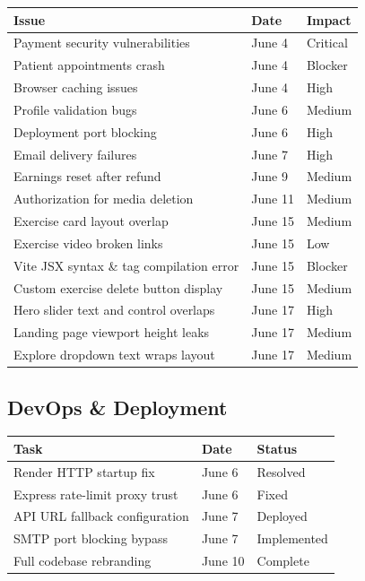 \documentclass[11pt,a4paper]{article}
\begin{document}
\begin{itemize}
{\begin{table}[h!]
\centering
\begin{tabularx}{\textwidth}{X l l}
\toprule
\textbf{Issue} & \textbf{Date} & \textbf{Impact} \\
\midrule
Payment security vulnerabilities    & June 4  & Critical \\
Patient appointments crash          & June 4  & Blocker  \\
Browser caching issues              & June 4  & High     \\
Profile validation bugs             & June 6  & Medium   \\
Deployment port blocking            & June 6  & High     \\
Email delivery failures             & June 7  & High     \\
Earnings reset after refund         & June 9  & Medium   \\
Authorization for media deletion    & June 11 & Medium   \\
Exercise card layout overlap        & June 15 & Medium   \\
Exercise video broken links         & June 15 & Low      \\
Vite JSX syntax \& tag compilation error & June 15 & Blocker \\
Custom exercise delete button display & June 15 & Medium \\
Hero slider text and control overlaps & June 17 & High   \\
Landing page viewport height leaks  & June 17 & Medium   \\
Explore dropdown text wraps layout  & June 17 & Medium   \\
\bottomrule
\end{tabularx}
\end{table}

\subsection{DevOps \& Deployment}

\begin{table}[h!]
\centering
\begin{tabularx}{\textwidth}{X l l}
\toprule
\textbf{Task} & \textbf{Date} & \textbf{Status} \\
\midrule
Render HTTP startup fix             & June 6  & Resolved    \\
Express rate-limit proxy trust      & June 6  & Fixed       \\
API URL fallback configuration      & June 7  & Deployed    \\
SMTP port blocking bypass           & June 7  & Implemented \\
Full codebase rebranding            & June 10 & Complete    \\
\bottomrule
\end{tabularx}
\end{table}

}
\end{itemize}
\end{document}
